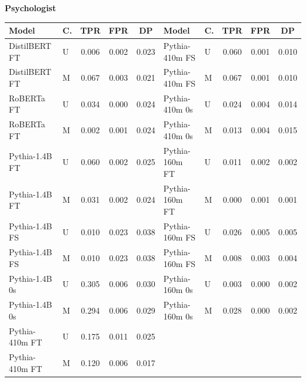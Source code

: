 \documentclass[11pt]{article}
\begin{document}
\vspace{4pt}\noindent\textbf{Psychologist}
\begin{center}\scriptsize
\begin{tabular}{llccc|llccc}
\toprule
\textbf{Model} & \textbf{C.} & \textbf{TPR} & \textbf{FPR} & \textbf{DP} & \textbf{Model} & \textbf{C.} & \textbf{TPR} & \textbf{FPR} & \textbf{DP} \\
\midrule
DistilBERT FT & U & 0.006 & 0.002 & 0.023 & Pythia-410m FS & U & 0.060 & 0.001 & 0.010 \\
DistilBERT FT & M & 0.067 & 0.003 & 0.021 & Pythia-410m FS & M & 0.067 & 0.001 & 0.010 \\
RoBERTa FT & U & 0.034 & 0.000 & 0.024 & Pythia-410m 0s & U & 0.024 & 0.004 & 0.014 \\
RoBERTa FT & M & 0.002 & 0.001 & 0.024 & Pythia-410m 0s & M & 0.013 & 0.004 & 0.015 \\
Pythia-1.4B FT & U & 0.060 & 0.002 & 0.025 & Pythia-160m FT & U & 0.011 & 0.002 & 0.002 \\
Pythia-1.4B FT & M & 0.031 & 0.002 & 0.024 & Pythia-160m FT & M & 0.000 & 0.001 & 0.001 \\
Pythia-1.4B FS & U & 0.010 & 0.023 & 0.038 & Pythia-160m FS & U & 0.026 & 0.005 & 0.005 \\
Pythia-1.4B FS & M & 0.010 & 0.023 & 0.038 & Pythia-160m FS & M & 0.008 & 0.003 & 0.004 \\
Pythia-1.4B 0s & U & 0.305 & 0.006 & 0.030 & Pythia-160m 0s & U & 0.003 & 0.000 & 0.002 \\
Pythia-1.4B 0s & M & 0.294 & 0.006 & 0.029 & Pythia-160m 0s & M & 0.028 & 0.000 & 0.002 \\
Pythia-410m FT & U & 0.175 & 0.011 & 0.025 & & & & & \\
Pythia-410m FT & M & 0.120 & 0.006 & 0.017 & & & & & \\
\bottomrule
\end{tabular}
\end{center}
\end{document}
